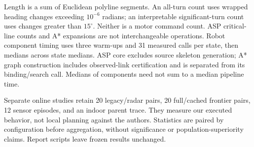 Length is a sum of Euclidean polyline segments. An all-turn count uses wrapped heading changes exceeding $10^{-6}$ radians; an interpretable significant-turn count uses changes greater than $15^\circ$. Neither is a motor command count. ASP critical-line counts and A* expansions are not interchangeable operations. Robot component timing uses three warm-ups and 31 measured calls per state, then medians across state medians. ASP core excludes source skeleton generation; A* graph construction includes observed-link certification and is separated from its binding/search call. Medians of components need not sum to a median pipeline time.

Separate online studies retain 20 legacy/radar pairs, 20 full/cached frontier pairs, 12 sensor episodes, and an indoor parent trace. They measure our executed behavior, not local planning against the authors. Statistics are paired by configuration before aggregation, without significance or population-superiority claims. Report scripts leave frozen results unchanged.
